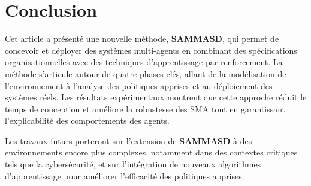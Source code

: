 \documentclass[sigconf,anonymous]{aamas}
\begin{document}
\section{Conclusion}
\label{sec:conclusion}
Cet article a présenté une nouvelle méthode, \textbf{SAMMASD}, qui permet de concevoir et déployer des systèmes multi-agents en combinant des spécifications organisationnelles avec des techniques d'apprentissage par renforcement. La méthode s'articule autour de quatre phases clés, allant de la modélisation de l'environnement à l'analyse des politiques apprises et au déploiement des systèmes réels. Les résultats expérimentaux montrent que cette approche réduit le temps de conception et améliore la robustesse des SMA tout en garantissant l'explicabilité des comportements des agents.

Les travaux futurs porteront sur l'extension de \textbf{SAMMASD} à des environnements encore plus complexes, notamment dans des contextes critiques tels que la cybersécurité, et sur l'intégration de nouveaux algorithmes d'apprentissage pour améliorer l'efficacité des politiques apprises.


\renewcommand\refname{}

\end{document}
